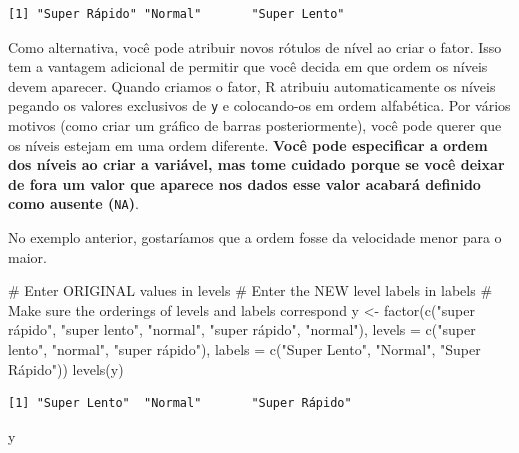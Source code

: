 \documentclass[
  letterpaper,
  DIV=11,
  numbers=noendperiod]{scrreprt}
\newenvironment{Shaded}{\begin{snugshade}}{\end{snugshade}}
\newcommand{\AttributeTok}[1]{\textcolor[rgb]{0.40,0.45,0.13}{#1}}
\newcommand{\CommentTok}[1]{\textcolor[rgb]{0.37,0.37,0.37}{#1}}
\newcommand{\FunctionTok}[1]{\textcolor[rgb]{0.28,0.35,0.67}{#1}}
\newcommand{\NormalTok}[1]{\textcolor[rgb]{0.00,0.23,0.31}{#1}}
\newcommand{\OtherTok}[1]{\textcolor[rgb]{0.00,0.23,0.31}{#1}}
\newcommand{\StringTok}[1]{\textcolor[rgb]{0.13,0.47,0.30}{#1}}
\begin{document}
\begin{verbatim}
[1] "Super Rápido" "Normal"       "Super Lento" 
\end{verbatim}

Como alternativa, você pode atribuir novos rótulos de nível ao criar o
fator. Isso tem a vantagem adicional de permitir que você decida em que
ordem os níveis devem aparecer. Quando criamos o fator, R atribuiu
automaticamente os níveis pegando os valores exclusivos de \texttt{y} e
colocando-os em ordem alfabética. Por vários motivos (como criar um
gráfico de barras posteriormente), você pode querer que os níveis
estejam em uma ordem diferente. \textbf{Você pode especificar a ordem
dos níveis ao criar a variável, mas tome cuidado porque se você deixar
de fora um valor que aparece nos dados esse valor acabará definido como
ausente (}\texttt{NA}\textbf{)}.

No exemplo anterior, gostaríamos que a ordem fosse da velocidade menor
para o maior.

\begin{Shaded}
\begin{Highlighting}[]
\CommentTok{\# Enter ORIGINAL values in levels }
\CommentTok{\# Enter the NEW level labels in labels }
\CommentTok{\# Make sure the orderings of levels and labels correspond }
\NormalTok{y }\OtherTok{\textless{}{-}} \FunctionTok{factor}\NormalTok{(}\FunctionTok{c}\NormalTok{(}\StringTok{"super rápido"}\NormalTok{, }\StringTok{"super lento"}\NormalTok{, }\StringTok{"normal"}\NormalTok{, }\StringTok{"super rápido"}\NormalTok{, }\StringTok{"normal"}\NormalTok{),              }
            \AttributeTok{levels =} \FunctionTok{c}\NormalTok{(}\StringTok{"super lento"}\NormalTok{, }\StringTok{"normal"}\NormalTok{, }\StringTok{"super rápido"}\NormalTok{), }
            \AttributeTok{labels =} \FunctionTok{c}\NormalTok{(}\StringTok{"Super Lento"}\NormalTok{, }\StringTok{"Normal"}\NormalTok{, }\StringTok{"Super Rápido"}\NormalTok{)) }
\FunctionTok{levels}\NormalTok{(y)}
\end{Highlighting}
\end{Shaded}

\begin{verbatim}
[1] "Super Lento"  "Normal"       "Super Rápido"
\end{verbatim}

\begin{Shaded}
\begin{Highlighting}[]
\NormalTok{y}
\end{Highlighting}
\end{Shaded}
\end{document}
